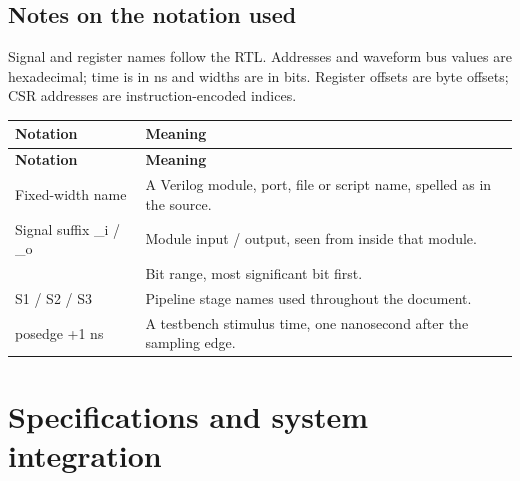 \documentclass[11pt]{article}
\begin{document}
\subsection{Notes on the notation used}
\noindent Signal and register names follow the RTL. Addresses and waveform bus values are hexadecimal; time is in ns and widths are in bits. Register offsets are byte offsets; CSR addresses are instruction-encoded indices.\par\medskip
{\small
\begin{longtable}{@{}L{0.2600\dimexpr\linewidth-12pt\relax}L{0.7400\dimexpr\linewidth-12pt\relax}@{}}
\toprule
\textbf{Notation} & \textbf{Meaning} \\ \midrule
\endfirsthead
\toprule
\textbf{Notation} & \textbf{Meaning} \\ \midrule
\endhead
Fixed-width name & A Verilog module, port, file or script name, spelled as in the source. \\ \addlinespace[3pt]
Signal suffix \_i / \_o & Module input / output, seen from inside that module. \\ \addlinespace[3pt]
[a:b] & Bit range, most significant bit first. \\ \addlinespace[3pt]
S1 / S2 / S3 & Pipeline stage names used throughout the document. \\ \addlinespace[3pt]
posedge +1 ns & A testbench stimulus time, one nanosecond after the sampling edge. \\*
\bottomrule\end{longtable}}

\clearpage
\section{Specifications and system integration}
\end{document}
